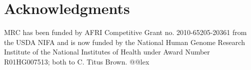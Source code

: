 \documentclass[11pt]{article}
\begin{document}




\section*{Acknowledgments}

MRC has been funded by AFRI Competitive Grant no. 2010-65205-20361
from the USDA NIFA and is now funded by the National Human Genome
Research Institute of the National Institutes of Health under Award
Number R01HG007513; both to C. Titus Brown.  @@lex








\end{document}
